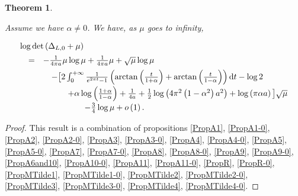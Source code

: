 \documentclass{jams-l}
\newtheorem{theorem}{Theorem}[section]
\theoremstyle{definition}
\theoremstyle{remark}
\numberwithin{equation}{section}
\begin{document}
            \begin{theorem}
            \label{ThmAlphaNeq0Mu}
        
                Assume we have $\alpha \neq 0$. We have, as $\mu$ goes to infinity,
            
                \[ \begin{array}{lll}
                        \multicolumn{3}{l}{\log \det \left( \Delta_{L,0} + \mu \right)} \\[0.5em]
                    
                        & = & - \frac{1}{4 \pi a} \mu \log \mu + \frac{1}{4 \pi a} \mu + \sqrt{\mu} \log \mu \\[0.5em]
                    
                        && \quad - \big[ 2 \int_0^{+ \infty} \frac{1}{e^{2 \pi t} - 1} \left( \arctan \left( \frac{t}{1 + \alpha} \right) + \arctan \left( \frac{t}{1 - \alpha} \right) \right) \mathrm{d}t - \log 2 \\[0.5em]
                    
                        && \qquad \quad + \alpha \log \left( \frac{1 + \alpha}{1 - \alpha} \right) + \frac{1}{4a} + \frac{1}{2} \log \left( 4 \pi^2 \left( 1 - \alpha^2 \right) a^2 \right) + \log \left( \pi \alpha a \right) \big] \sqrt{\mu} \\[0.5em]
                    
                        && \qquad \qquad \quad - \frac{3}{4} \log \mu + o \left( 1 \right).
                    \end{array} \]
        
            \end{theorem}
        
            \begin{proof}
        
                This result is a combination of propositions \ref{PropA1}, \ref{PropA1-0}, \ref{PropA2}, \ref{PropA2-0}, \ref{PropA3}, \ref{PropA3-0}, \ref{PropA4}, \ref{PropA4-0}, \ref{PropA5}, \ref{PropA5-0}, \ref{PropA7}, \ref{PropA7-0}, \ref{PropA8}, \ref{PropA8-0}, \ref{PropA9}, \ref{PropA9-0}, \ref{PropA6and10}, \ref{PropA10-0}, \ref{PropA11}, \ref{PropA11-0}, \ref{PropR}, \ref{PropR-0}, \ref{PropMTilde1}, \ref{PropMTilde1-0}, \ref{PropMTilde2}, \ref{PropMTilde2-0}, \ref{PropMTilde3}, \ref{PropMTilde3-0}, \ref{PropMTilde4}, \ref{PropMTilde4-0}.
        
            \end{proof}
        
\end{document}
